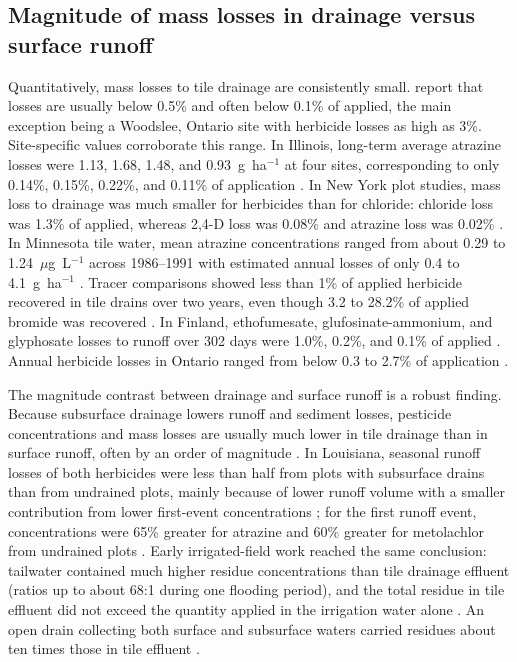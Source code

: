 \documentclass[11pt]{article}
\begin{document}
\subsection{Magnitude of mass losses in drainage versus surface runoff}
Quantitatively, mass losses to tile drainage are consistently small. \textcite{Kladivko2001} report that losses are usually below 0.5\% and often below 0.1\% of applied, the main exception being a Woodslee, Ontario site with herbicide losses as high as 3\%. Site-specific values corroborate this range. In Illinois, long-term average atrazine losses were 1.13, 1.68, 1.48, and 0.93~g~ha$^{-1}$ at four sites, corresponding to only 0.14\%, 0.15\%, 0.22\%, and 0.11\% of application \parencite{Kalita2006}. In New York plot studies, mass loss to drainage was much smaller for herbicides than for chloride: chloride loss was 1.3\% of applied, whereas 2,4-D loss was 0.08\% and atrazine loss was 0.02\% \parencite{Shalit1996}. In Minnesota tile water, mean atrazine concentrations ranged from about 0.29 to 1.24~$\mu$g~L$^{-1}$ across 1986--1991 with estimated annual losses of only 0.4 to 4.1~g~ha$^{-1}$ \parencite{BUHLER1993}. Tracer comparisons showed less than 1\% of applied herbicide recovered in tile drains over two years, even though 3.2 to 28.2\% of applied bromide was recovered \parencite{Fortin2002}. In Finland, ethofumesate, glufosinate-ammonium, and glyphosate losses to runoff over 302 days were 1.0\%, 0.2\%, and 0.1\% of applied \parencite{Siimes2006}. Annual herbicide losses in Ontario ranged from below 0.3 to 2.7\% of application \parencite{Gaynor2001}.

The magnitude contrast between drainage and surface runoff is a robust finding. Because subsurface drainage lowers runoff and sediment losses, pesticide concentrations and mass losses are usually much lower in tile drainage than in surface runoff, often by an order of magnitude \parencite{Kladivko2001}. In Louisiana, seasonal runoff losses of both herbicides were less than half from plots with subsurface drains than from undrained plots, mainly because of lower runoff volume with a smaller contribution from lower first-event concentrations \parencite{SOUTHWICK1990}; for the first runoff event, concentrations were 65\% greater for atrazine and 60\% greater for metolachlor from undrained plots \parencite{SOUTHWICK1990}. Early irrigated-field work reached the same conclusion: tailwater contained much higher residue concentrations than tile drainage effluent (ratios up to about 68:1 during one flooding period), and the total residue in tile effluent did not exceed the quantity applied in the irrigation water alone \parencite{JOHNSTON1967}. An open drain collecting both surface and subsurface waters carried residues about ten times those in tile effluent \parencite{JOHNSTON1967}.
\end{document}
